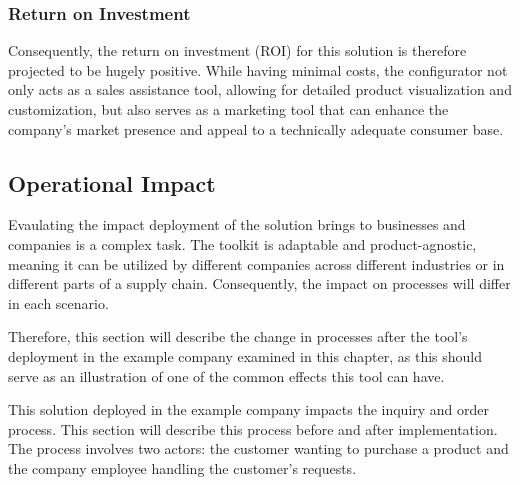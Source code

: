 \subsubsection{Return on Investment}

Consequently, the return on investment (ROI) for this solution is therefore projected to be hugely positive. While having minimal costs, the configurator not only acts as a sales assistance tool, allowing for detailed product visualization and customization, but also serves as a marketing tool that can enhance the company's market presence and appeal to a technically adequate consumer base. 


\subsection{Operational Impact}

Evaulating the impact deployment of the solution brings to businesses and companies is a complex task. The toolkit is adaptable and product-agnostic, meaning it can be utilized by different companies across different industries or in different parts of a supply chain. Consequently, the impact on processes will differ in each scenario.

Therefore, this section will describe the change in processes after the tool's deployment in the example company examined in this chapter, as this should serve as an illustration of one of the common effects this tool can have.

This solution deployed in the example company impacts the inquiry and order process. This section will describe this process before and after implementation. The process involves two actors: the customer wanting to purchase a product and the company employee handling the customer's requests.

